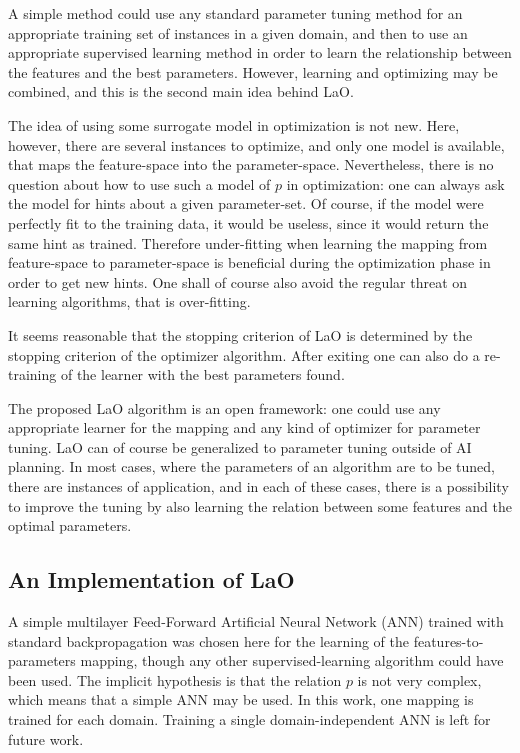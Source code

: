 \documentclass{MYsig-alternate}
\begin{document}
A simple method could use any standard parameter tuning method for an appropriate training set of instances in a given domain, and then to use an appropriate supervised learning method in order to learn the relationship between the features and the best parameters. However, learning and optimizing may be combined, and this is the second main idea behind LaO.

The idea of using some surrogate model in optimization is not new. Here, however, there are  several instances to optimize, and only one model is available, that maps the feature-space into the parameter-space. Nevertheless, there is no question about how to use such a model of \begin{math}p\end{math} in optimization: one can always ask the model for hints about a given parameter-set. Of course, if the model were perfectly fit to the training data, it would be useless, since it would return the same hint as trained. Therefore under-fitting when learning the mapping from feature-space to parameter-space is beneficial during the optimization phase in order to get new hints. One shall of course also avoid the regular threat on learning algorithms, that is over-fitting.

It seems reasonable that the stopping criterion of LaO is determined by the stopping criterion of the optimizer algorithm. After exiting one can also do a re-training of the learner with the best parameters found.

The proposed LaO algorithm is an open framework: one could use any appropriate learner for the mapping and any kind of optimizer for parameter tuning. LaO can of course be generalized to parameter tuning outside of AI planning. In most cases, where the parameters of an algorithm are to be tuned, there are instances of application, and in each of these cases, there is a possibility to improve the tuning by also learning the relation between some features and the optimal parameters.

\subsection{An Implementation of LaO}

A simple multilayer Feed-Forward Artificial Neural Network (ANN) trained with standard backpropagation was chosen here for the learning of the features-to-parameters mapping, though any other supervised-learning algorithm could have been used. The implicit hypothesis is that the relation \begin{math}p\end{math} is not very complex, which means that a simple ANN may be used. In this work, one mapping is trained for each domain. Training a single domain-independent ANN is left for future work.
\end{document}
